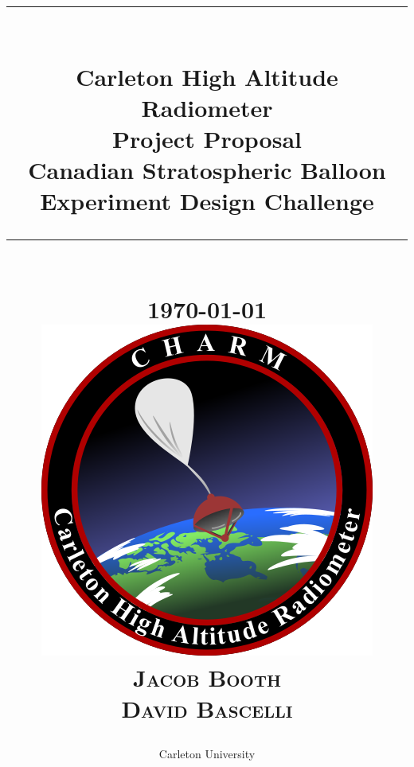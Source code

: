 \documentclass[12pt]{article}
\newcommand{\HRule}[1]{\rule{\linewidth}{#1}}
\begin{document}


\title{ \normalsize \textsc{}
		\\ [2.0cm]
		\HRule{0.5pt} \\
		\LARGE \textbf{{Carleton High Altitude Radiometer}}\\
		\large \textbf{{Project Proposal}}\\
		\large \textbf{{Canadian Stratospheric Balloon Experiment Design Challenge}}
		\HRule{2pt} \\ [0.5cm]
		\normalsize \today \vspace*{2\baselineskip}\\
		\includegraphics[scale=0.6]{Figures/CHARM.png}	\vspace*{2\baselineskip} \\
		\textsc{
		Jacob Booth \\
		David Bascelli \\
		}}
		
\date{}
	
\author{
		Carleton University \\
		}
	


\maketitle

\newpage

\tableofcontents
\newpage

\listoffigures
\newpage
\end{document}
